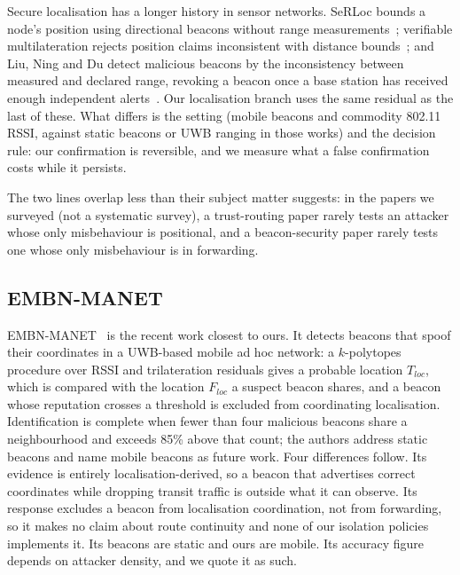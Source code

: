Secure localisation has a longer history in sensor networks. SeRLoc bounds a
node's position using directional beacons without range
measurements~\cite{lazos2004serloc}; verifiable multilateration rejects
position claims inconsistent with distance bounds~\cite{capkun2006secure};
and Liu, Ning and Du detect malicious beacons by the inconsistency between
measured and declared range, revoking a beacon once a base station has
received enough independent alerts~\cite{liu2005detecting}. Our localisation
branch uses the same residual as the last of these. What differs is the
setting (mobile beacons and commodity 802.11 RSSI, against static beacons
or UWB ranging in those works) and the decision rule: our confirmation is
reversible, and we measure what a false confirmation costs while it
persists.

The two lines overlap less than their subject matter suggests: in the papers
we surveyed (not a systematic survey), a trust-routing paper rarely tests an
attacker whose only misbehaviour is positional, and a beacon-security paper
rarely tests one whose only misbehaviour is in forwarding.

\subsection{EMBN-MANET}

EMBN-MANET~\cite{kuriakose2023embn} is the recent work closest to ours. It
detects beacons that spoof their coordinates in a UWB-based mobile ad hoc
network: a $k$-polytopes procedure over RSSI and trilateration residuals gives
a probable location $T_{loc}$, which is compared with the location $F_{loc}$ a
suspect beacon shares, and a beacon whose reputation crosses a threshold is
excluded from coordinating localisation. Identification is complete when fewer
than four malicious beacons share a neighbourhood and exceeds 85\% above that
count; the authors address static beacons and name mobile beacons as future
work. Four differences follow. Its evidence is entirely localisation-derived,
so a beacon that advertises correct coordinates while dropping transit
traffic is outside what it can observe. Its response excludes a beacon from
localisation coordination, not from forwarding, so it makes no claim about
route continuity and none of our isolation policies implements it. Its
beacons are static and ours are mobile. Its accuracy figure depends on
attacker density, and we quote it as such.

